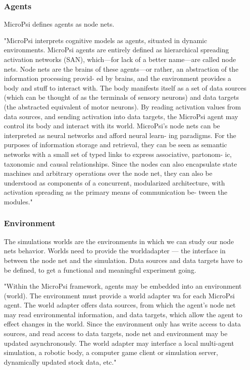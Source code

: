             \subsubsection{Agents}
MicroPsi defines agents as node nets.~\cite{conf/agi/Bach12}
                
"MicroPsi interprets cognitive models as agents, situated in dynamic environments. MicroPsi agents are entirely defined as hierarchical spreading activation networks (SAN), which—for lack of a better name—are called node nets. Node nets are the brains of these agents—or rather, an abstraction of the information processing provid- ed by brains, and the environment provides a body and stuff to interact with.
The body manifests itself as a set of data sources (which can be thought of as the terminals of sensory neurons) and data targets (the abstracted equivalent of motor neurons). By reading activation values from data sources, and sending activation into data targets, the MicroPsi agent may control its body and interact with its world.
MicroPsi’s node nets can be interpreted as neural networks and afford neural learn- ing paradigms. For the purposes of information storage and retrieval, they can be seen as semantic networks with a small set of typed links to express associative, partonom- ic, taxonomic and causal relationships.
Since the nodes can also encapsulate state machines and arbitrary operations over the node net, they can also be understood as components of a concurrent, modularized architecture, with activation spreading as the primary means of communication be- tween the modules."~\cite{conf/agi/Bach12}

            \subsubsection{Environment}
The simulations worlds are the environments in which we can study our node nets behavior. Worlds need to provide the worldadapter --- the interface in between the node net and the simulation. Data sources and data targets have to be defined, to get a functional and meaningful experiment going.~\cite{conf/agi/Bach12}
                
"Within the MicroPsi framework, agents may be embedded into an environment (world). The environment must provide a world adapter wa for each MicroPsi agent. The world adapter offers data sources, from which the agent’s node net may read environmental information, and data targets, which allow the agent to effect changes in the world. Since the environment only has write access to data sources, and read access to data targets, node net and environment may be updated asynchronously.
The world adapter may interface a local multi-agent simulation, a robotic body, a computer game client or simulation server, dynamically updated stock data, etc."~\cite{conf/agi/Bach12}

